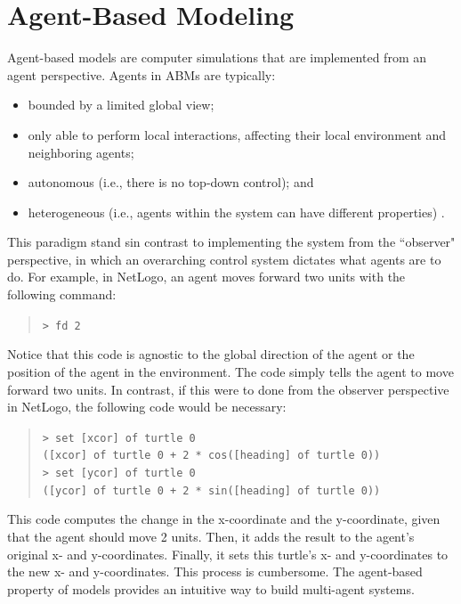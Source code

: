 \section{Agent-Based Modeling}
\label{sec:abm}
Agent-based models are computer simulations that are implemented from an agent perspective.
Agents in ABMs are typically\cite{epstein1999agent}:
\begin{itemize}
   \item bounded by a limited global view;
   \item only able to perform local interactions, affecting their local environment and neighboring agents;
   \item autonomous (i.e., there is no top-down control); and
   \item heterogeneous (i.e., agents within the system can have different properties) .
\end{itemize}
This paradigm stand sin contrast to implementing the system from the ``observer" perspective, in which an overarching control system dictates what agents are to do.
For example, in NetLogo, an agent moves forward two units with the following command:
\begin{quote}
\texttt{\small > fd 2}
\end{quote}
Notice that this code is agnostic to the global direction of the agent or the position of the agent in the environment.
The code simply tells the agent to move forward two units.
In contrast, if this were to done from the observer perspective in NetLogo, the following code would be necessary:
\begin{quote}
\texttt{\small > set [xcor] of turtle 0\\
([xcor] of turtle 0 + 2 * cos([heading] of turtle 0))\\
> set [ycor] of turtle 0\\
([ycor] of turtle 0 + 2 * sin([heading] of turtle 0))}
\end{quote}
This code computes the change in the x-coordinate and the y-coordinate, given that the agent should move 2 units.
Then, it adds the result to the agent's original x- and y-coordinates.
Finally, it sets this turtle's x- and y-coordinates to the new x- and y-coordinates.
This process is cumbersome.
The agent-based property of models provides an intuitive way to build multi-agent systems.


